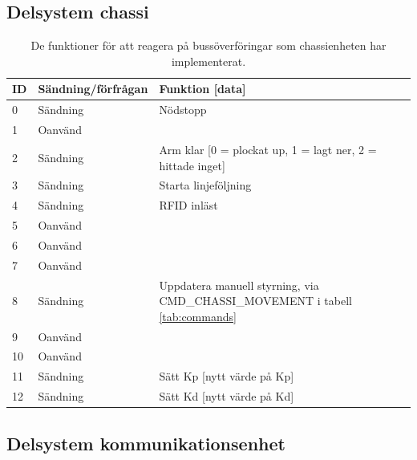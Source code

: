 \subsection{Delsystem chassi}

\begin{table}[H]
\centering

\begin{tabularx}{\textwidth}{|l|l|X|}
\hline
\textbf{ID} & \textbf{Sändning/förfrågan} & \textbf{Funktion [data]} \\ \hline
0 & Sändning & Nödstopp \\ \hline
1 & Oanvänd & \\ \hline
2 & Sändning & Arm klar [0 = plockat up, 1 = lagt ner, 2 = hittade inget] \\ \hline
3 & Sändning & Starta linjeföljning \\ \hline
4 & Sändning & RFID inläst \\ \hline
5 & Oanvänd & \\ \hline
6 & Oanvänd & \\ \hline
7 & Oanvänd & \\ \hline
8 & Sändning & Uppdatera manuell styrning, via CMD\_CHASSI\_MOVEMENT i tabell \ref{tab:commands}\\ \hline
9 & Oanvänd & \\ \hline
10 & Oanvänd & \\ \hline
11 & Sändning & Sätt Kp [nytt värde på Kp] \\ \hline
12 & Sändning & Sätt Kd [nytt värde på Kd] \\ \hline
\end{tabularx}
\caption{De funktioner för att reagera på bussöverföringar som chassienheten har implementerat.}
\label{tab:callbacks-chassi}
\end{table}

\subsection{Delsystem kommunikationsenhet}

